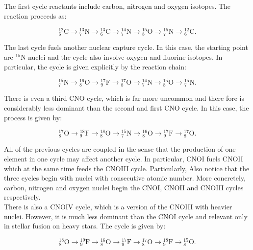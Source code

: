 \documentclass[openany]{book}
\begin{document}
 The first cycle reactants include carbon, nitrogen and oxygen isotopes. The reaction proceeds as:  

\begin{equation} \label{eq:reaction_CNO_C}
	\mathrm{{}_{6}^{12}C  \rightarrow {}^{13}_{7}N  \rightarrow {}^{13}_{6}C  \rightarrow {}^{14}_{7}N  \rightarrow {}^{15}_{8}O  \rightarrow {}^{15}_{7}N \rightarrow {}^{12}_{6}C}.
\end{equation}

The last cycle fuels another nuclear capture cycle. In this case, the starting point are $\mathrm{{}^{15}N}$ nuclei and the cycle also involve oxygen and fluorine isotopes. In particular, the cycle is given explicitly by the reaction chain: 

\begin{equation} \label{eq:reaction_CNO_N}
	\mathrm{{}_{7}^{15}N  \rightarrow {}^{16}_{8}O  \rightarrow {}^{17}_{9}F  \rightarrow {}^{17}_{8}O  \rightarrow {}^{14}_{7}N  \rightarrow {}^{15}_{8}O \rightarrow {}^{15}_{7}N  }.
\end{equation}

There is even a third CNO cycle, which is far more uncommon and there fore is considerably less dominant than the second and first CNO cycle. In this case, the process is given by: 

\begin{equation} \label{eq:reaction_CNO_O}
	\mathrm{{}_{8}^{17}O  \rightarrow {}^{18}_{9}F  \rightarrow {}^{18}_{8}O  \rightarrow {}^{15}_{7}N  \rightarrow {}^{16}_{8}O  \rightarrow {}^{17}_{9}F \rightarrow {}^{17}_{8}O  }.
\end{equation}

All of the previous cycles are coupled in the sense that the production of one element in one cycle may affect another cycle. In particular, CNOI fuels CNOII which at the same time feeds the CNOIII cycle. Particularly, Also notice that the three cycles begin with nuclei with consecutive atomic number. More concretely, carbon, nitrogen and oxygen nuclei begin the CNOI, CNOII and CNOIII cycles respectively.\\

There is also a CNOIV cycle, which is a version of the CNOIII with heavier nuclei. However, it is much less dominant than the CNOI cycle and relevant only in stellar fusion on heavy stars. The cycle is given by:

\begin{equation} \label{eq:reaction_CNO_O_4}
	\mathrm{{}_{8}^{18}O  \rightarrow {}^{19}_{9}F  \rightarrow {}^{16}_{8}O  \rightarrow {}^{17}_{9}F  \rightarrow {}^{17}_{8}O  \rightarrow {}^{18}_{9}F \rightarrow {}^{15}_{8}O }.
\end{equation}
\end{document}
